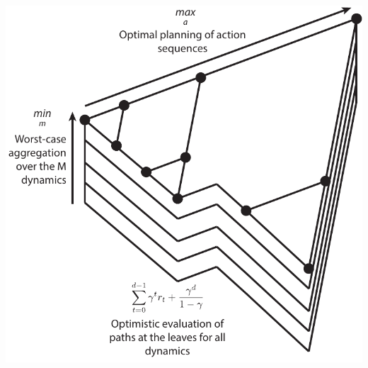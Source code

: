 \documentclass[paperwidth=36in,paperheight=48in,portrait,fontscale=0.355, margin=2cm]{baposter}
\begin{document}
\begin{poster}
{\begin{minipage}{0.7\textwidth}
\end{minipage}
\hfill%
\begin{minipage}{0.25\textwidth}
\begin{center}
	\includegraphics[width=0.8\linewidth]{../img/robust-control-tree}
\end{center}

\end{minipage}
}


\end{poster}
\end{document}
